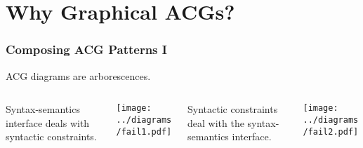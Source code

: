 \documentclass{beamer}
\begin{document}
\section{Why Graphical ACGs?}

\begin{frame}
  \frametitle{Composing ACG Patterns I}

  ACG diagrams are arborescences.

  \begin{columns}[c]
    \begin{column}{0.25\textwidth}
      {\small Syntax-semantics interface deals with syntactic
        constraints.}

    \end{column}
    \begin{column}{0.25\textwidth}
      \begin{center}
        \texttt{[image: ../diagrams/fail1.pdf]}
      \end{center}
    \end{column}
    \begin{column}{0.25\textwidth}
      {\small Syntactic constraints deal with the syntax-semantics
        interface.}

    \end{column}
    \begin{column}{0.25\textwidth}
      \begin{center}
        \texttt{[image: ../diagrams/fail2.pdf]}
      \end{center}
    \end{column}
  \end{columns}
\end{frame}
\end{document}
